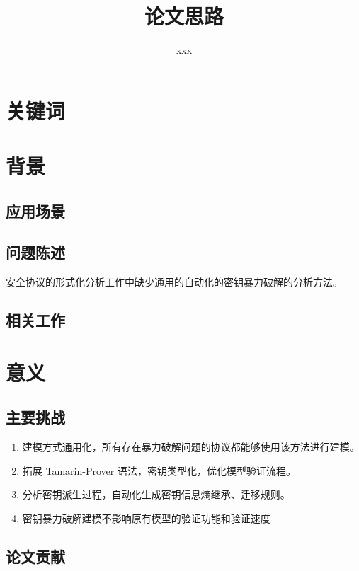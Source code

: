 \documentclass[UTF8]{ctexart}
\title{论文思路}
\author{xxx}
\begin{document}
\maketitle
\section{关键词}

\section{背景}
\subsection{应用场景}

\subsection{问题陈述}
安全协议的形式化分析工作中缺少通用的自动化的密钥暴力破解的分析方法。

\subsection{相关工作}

\section{意义}
\subsection{主要挑战}

\begin{enumerate}
    \item 建模方式通用化，所有存在暴力破解问题的协议都能够使用该方法进行建模。
    \item 拓展 Tamarin-Prover 语法，密钥类型化，优化模型验证流程。
    \item 分析密钥派生过程，自动化生成密钥信息熵继承、迁移规则。
    \item 密钥暴力破解建模不影响原有模型的验证功能和验证速度
\end{enumerate}


\subsection{论文贡献}
\end{document}
